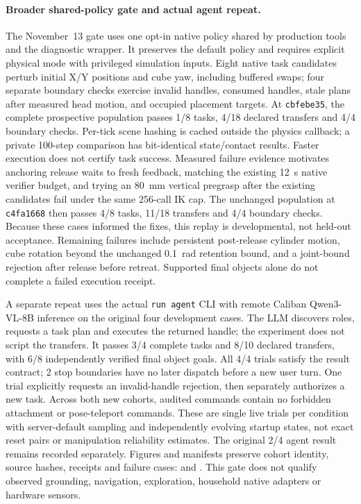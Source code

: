 \paragraph{Broader shared-policy gate and actual agent repeat.}
The November~13 gate uses one opt-in native policy shared by production tools
and the diagnostic wrapper. It preserves the default policy and requires
explicit physical mode with privileged simulation inputs. Eight native task
candidates perturb initial X/Y positions and cube yaw, including buffered swaps;
four separate boundary checks exercise invalid handles, consumed handles,
stale plans after measured head motion, and occupied placement targets.
At \texttt{cbfebe35}, the complete prospective population passes 1/8 tasks,
4/18 declared transfers and 4/4 boundary checks. Per-tick scene hashing is cached
outside the physics callback; a private 100-step comparison has bit-identical
state/contact results. Faster execution does not certify task success.
Measured failure evidence motivates anchoring release waits to fresh feedback,
matching the existing 12~s native verifier budget, and trying an 80~mm vertical
pregrasp after the existing candidates fail under the same 256-call IK cap.
The unchanged population at \texttt{c4fa1668} then passes 4/8 tasks,
11/18 transfers and 4/4 boundary checks. Because these
cases informed the fixes, this replay is developmental, not held-out acceptance.
Remaining failures include persistent post-release cylinder motion, cube rotation
beyond the unchanged 0.1~rad retention bound, and a joint-bound rejection after
release before retreat. Supported final objects alone do not complete a failed
execution receipt.

A separate repeat uses the actual \texttt{run agent} CLI with remote Caliban
Qwen3-VL-8B inference on the original four development cases. The LLM discovers
roles, requests a task plan and executes the returned handle; the experiment
does not script the transfers. It passes 3/4 complete tasks and
8/10 declared transfers, with 6/8 independently verified
final object goals. All 4/4 trials satisfy the result contract;
2 stop boundaries have no later dispatch before a new user turn.
One trial explicitly requests an invalid-handle rejection, then separately
authorizes a new task. Across both new cohorts, audited commands contain no
forbidden attachment or pose-teleport commands. These are single live trials
per condition with server-default sampling and independently evolving startup
states, not exact reset pairs or manipulation reliability estimates.
The original 2/4 agent result remains recorded separately. Figures and manifests
preserve cohort identity, source hashes, receipts and failure cases:
 and
.
This gate does not qualify observed grounding, navigation, exploration, household
native adapters or hardware sensors.

